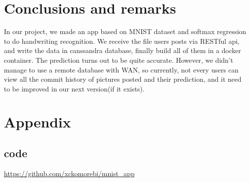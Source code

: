 \documentclass[12pt,hyperref,]{ctexart}
\begin{document}
\newpage

\section{Conclusions and remarks}\label{conclusions-and-remarks}

In our project, we made an app based on MNIST dataset and softmax
regression to do handwriting recognition. We receive the file users
posts via RESTful api, and write the data in canssandra database,
finally build all of them in a docker container. The prediction turns
out to be quite accurate. However, we didn't manage to use a remote
database with WAN, so currently, not every users can view all the commit
history of pictures posted and their prediction, and it need to be
improved in our next version(if it exists).

\section{Appendix}\label{appendix}

\subsection{code}\label{code}

\url{https://github.com/xckomorebi/mnist_app}
\end{document}

